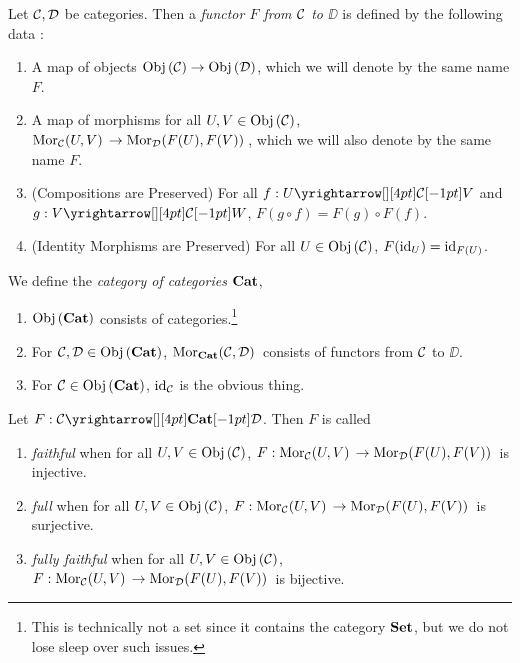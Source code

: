 \begin{dfn}[Functors]
  
  Let $\mathcal{C}, \mathcal{D}$ be categories. 
  Then a \emph{functor $F$ from $\mathcal{C}$ to $\DD$} is defined by 
  the following data :
  \begin{enumerate}
    \item A map of objects $\mathrm{Obj}\left(\mathcal{C}\right) \to \mathrm{Obj}\left(\mathcal{D}\right)$,
    which we will denote by the same name $F$. 
    \item A map of morphisms for all $U, V \in \mathrm{Obj}\left(\mathcal{C}\right)$, 
    $\mathrm{Mor}_{\mathcal{C}}(U, V)\, \to \mathrm{Mor}_{\mathcal{D}}(F(U), F(V))\,$,
    which we will also denote by the same name $F$. 
    \item (Compositions are Preserved)
    For all $f : \map{U}{V}{\CC}{}$ and $g : \map{V}{W}{\CC}{}$, 
    $F(g \circ f) = F(g) \circ F(f)$. 
    \item (Identity Morphisms are Preserved)
    For all $U \in \mathrm{Obj}\left(\mathcal{C}\right)$, $F(\mathrm{id}_{U}) = \mathrm{id}_{F(U)}$.
  \end{enumerate}
\end{dfn}

\begin{dfn}\hypertarget{bigcat}{}
  
  We define the \emph{category of categories} $\mathbf{Cat}$, 
  \begin{enumerate}
    \item $\mathrm{Obj}\left(\mathbf{Cat}\right)$ consists of categories.\footnote{
      This is technically not a set since it contains the category $\mathbf{Set}$,
      but we do not lose sleep over such issues. 
    }
    \item For $\mathcal{C}, \mathcal{D} \in \mathrm{Obj}\left(\mathbf{Cat}\right)$, 
    $\mathrm{Mor}_{\mathbf{Cat}}(\mathcal{C}, \mathcal{D})\,$ consists of functors from $\mathcal{C}$ to $\DD$.  
    \item For $\mathcal{C} \in \mathrm{Obj}\left(\mathbf{Cat}\right)$, $\mathrm{id}_{\mathcal{C}}$ is the obvious thing.
  \end{enumerate}
\end{dfn}

\begin{dfn}
  
  Let $F : \map{\CC}{\DD}{\CAT}{}$.
  Then $F$ is called 
  \begin{enumerate}
    \item \emph{faithful} when for all $U, V \in \mathrm{Obj}\left(\mathcal{C}\right)$,
    $F : \mathrm{Mor}_{\mathcal{C}}(U, V)\, \to \mathrm{Mor}_{\mathcal{D}}(F(U), F(V))\,$ is injective. 
    \item \emph{full} when for all $U, V \in \mathrm{Obj}\left(\mathcal{C}\right)$,
    $F : \mathrm{Mor}_{\mathcal{C}}(U, V)\, \to \mathrm{Mor}_{\mathcal{D}}(F(U), F(V))\,$ is surjective.
    \item \emph{fully faithful} when for all $U, V \in \mathrm{Obj}\left(\mathcal{C}\right)$,
    $F : \mathrm{Mor}_{\mathcal{C}}(U, V)\, \to \mathrm{Mor}_{\mathcal{D}}(F(U), F(V))\,$ is bijective.
  \end{enumerate}
\end{dfn}

